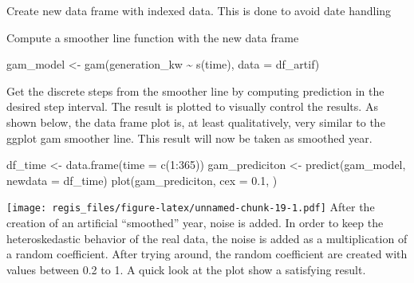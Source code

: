 \documentclass[
]{article}
\newenvironment{Shaded}{\begin{snugshade}}{\end{snugshade}}
\newcommand{\AttributeTok}[1]{\textcolor[rgb]{0.77,0.63,0.00}{#1}}
\newcommand{\DecValTok}[1]{\textcolor[rgb]{0.00,0.00,0.81}{#1}}
\newcommand{\FloatTok}[1]{\textcolor[rgb]{0.00,0.00,0.81}{#1}}
\newcommand{\FunctionTok}[1]{\textcolor[rgb]{0.00,0.00,0.00}{#1}}
\newcommand{\NormalTok}[1]{#1}
\newcommand{\OtherTok}[1]{\textcolor[rgb]{0.56,0.35,0.01}{#1}}
\newcommand{\SpecialCharTok}[1]{\textcolor[rgb]{0.00,0.00,0.00}{#1}}
\begin{document}
Create new data frame with indexed data. This is done to avoid date
handling

\begin{Shaded}
\end{Shaded}

Compute a smoother line function with the new data frame

\begin{Shaded}
\begin{Highlighting}[]
\NormalTok{gam\_model }\OtherTok{\textless{}{-}} \FunctionTok{gam}\NormalTok{(generation\_kw }\SpecialCharTok{\textasciitilde{}} \FunctionTok{s}\NormalTok{(time), }\AttributeTok{data =}\NormalTok{ df\_artif)}
\end{Highlighting}
\end{Shaded}

Get the discrete steps from the smoother line by computing prediction in
the desired step interval. The result is plotted to visually control the
results. As shown below, the data frame plot is, at least qualitatively,
very similar to the ggplot gam smoother line. This result will now be
taken as smoothed year.

\begin{Shaded}
\begin{Highlighting}[]
\NormalTok{df\_time }\OtherTok{\textless{}{-}} \FunctionTok{data.frame}\NormalTok{(}\AttributeTok{time =} \FunctionTok{c}\NormalTok{(}\DecValTok{1}\SpecialCharTok{:}\DecValTok{365}\NormalTok{))}
\NormalTok{gam\_prediciton }\OtherTok{\textless{}{-}} \FunctionTok{predict}\NormalTok{(gam\_model, }\AttributeTok{newdata =}\NormalTok{ df\_time)}
\FunctionTok{plot}\NormalTok{(gam\_prediciton, }\AttributeTok{cex =} \FloatTok{0.1}\NormalTok{, )}
\end{Highlighting}
\end{Shaded}

\texttt{[image: regis\_files/figure-latex/unnamed-chunk-19-1.pdf]} After
the creation of an artificial ``smoothed'' year, noise is added. In
order to keep the heteroskedastic behavior of the real data, the noise
is added as a multiplication of a random coefficient. After trying
around, the random coefficient are created with values between 0.2 to 1.
A quick look at the plot show a satisfying result.
\end{document}
